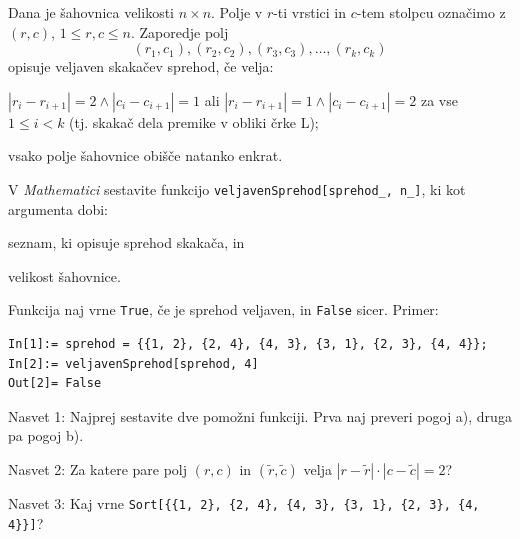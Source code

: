 \documentclass[arhiv]{../izpit}
\begin{document}


Dana je šahovnica velikosti $n \times n$. Polje v $r$-ti vrstici in $c$-tem stolpcu označimo z $(r, c)$, $1 \leq r, c \leq n$. Zaporedje polj
$$
(r_1, c_1), (r_2, c_2), (r_3, c_3), \ldots, (r_{k}, c_{k})
$$
opisuje veljaven skakačev sprehod, če velja:
\begin{compactenum}
\renewcommand{\labelenumi}{\alph{enumi})}
\item $|r_i - r_{i+1}| = 2 \land |c_i - c_{i+1}| = 1$ ali $|r_i - r_{i+1}| = 1 \land |c_i - c_{i+1}| = 2$ za vse $1 \leq i < k$ (tj. skakač dela premike v obliki črke L);
\item vsako polje šahovnice obišče natanko enkrat.
\end{compactenum}

\vspace{\baselineskip}

\noindent V \emph{Mathematici} sestavite funkcijo \texttt{veljavenSprehod[sprehod\_, n\_]}, ki kot argumenta dobi:
\begin{compactitem}
\item seznam, ki opisuje sprehod skakača, in
\item velikost šahovnice.
\end{compactitem}
Funkcija naj vrne \texttt{True}, če je sprehod veljaven, in \texttt{False} sicer. Primer:
%
\begin{verbatim}
In[1]:= sprehod = {{1, 2}, {2, 4}, {4, 3}, {3, 1}, {2, 3}, {4, 4}};
In[2]:= veljavenSprehod[sprehod, 4]
Out[2]= False
\end{verbatim}

\noindent Nasvet 1: Najprej sestavite dve pomožni funkciji. Prva naj preveri pogoj a), druga pa pogoj b).

\vspace{0.5\baselineskip}
\noindent Nasvet 2: Za katere pare polj $(r, c)$ in $(\tilde{r}, \tilde{c})$ velja $|r - \tilde{r}| \cdot |c - \tilde{c}| = 2$?

\vspace{0.5\baselineskip}
\noindent Nasvet 3: Kaj vrne \texttt{Sort[\{\{1, 2\}, \{2, 4\}, \{4, 3\}, \{3, 1\}, \{2, 3\}, \{4, 4\}\}]}?

\end{document}
